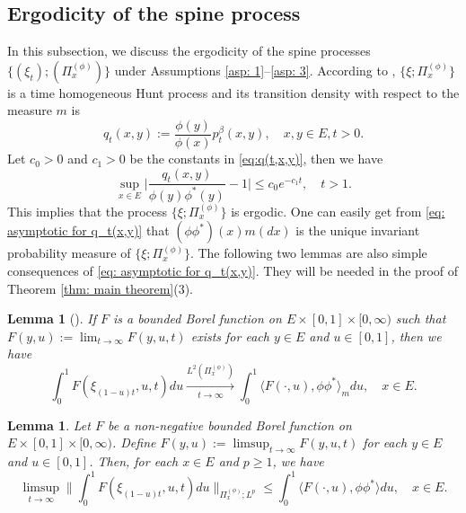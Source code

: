 \documentclass[12pt, a4paper]{amsart}
\newtheorem{lem}[thm]{Lemma}
\theoremstyle{definition}
\numberwithin{equation}{section}
\begin{document}
\subsection{Ergodicity of the spine process}
\label{sec: Ergodicity}
	In this subsection, we discuss the ergodicity of the spine processes 
	$\{(\xi_t); (\Pi^{(\phi)}_x)\}$ 
	under Assumptions \ref{asp: 1}--\ref{asp: 3}.
	According to \cite{KimSong2008Intrinsic}, $\{\xi; \Pi^{(\phi)}_x\}$ is a time homogeneous Hunt process and its transition density with respect to the measure $m$ is
\[
	q_t(x,y) := \frac{\phi(y)}{\phi(x)} p^\beta_t(x,y),
	\quad x,y\in E, t>0.
\]
Let   $c_0>0$ and $c_1>0$ be the constants  in \eqref{eq:q(t,x,y)}, then we have
\[\label{eq: asymptotic for q_t(x,y)}
	\sup_{x\in E} \Big| \frac{q_t(x,y)}{\phi(y)\phi^*(y)} - 1\Big|
	\leq c_0 e^{-c_1 t},
	\quad t > 1.
\]
	This implies that the process $\{\xi; \Pi^{(\phi)}_x\}$ is ergodic.
	One can easily get from \eqref{eq: asymptotic for q_t(x,y)} that $(\phi\phi^*)(x)m(dx)$ is the unique invariant probability measure of $\{\xi; \Pi^{(\phi)}_x\}$.
	The following two lemmas are also simple consequences of \eqref{eq: asymptotic for q_t(x,y)}.
	They will be needed in the proof of  Theorem \ref{thm: main theorem}(3).
\begin{lem}[{\cite[Lemma 5.6]{RenSongSun2017Spine}}] \label{lem: ergodicity of the underlying process}
	If $F$ is a bounded Borel function on $E\times [0,1]\times [0,\infty)$ such that $F(y,u):= \lim_{t\to \infty} F(y,u,t)$ exists for each $y\in E$ and $u \in [0,1]$, 
	then we have
\[
	\int_0^1 F(\xi_{(1-u)t},u,t) du
\xrightarrow[t\to \infty]{ L^2(\Pi_x^{(\phi)})} 
\int_0^1 \langle F(\cdot , u), \phi\phi^*\rangle_m du,
	\quad x\in E.
\]
\end{lem}
\begin{lem}\label{lem: Fatou-ergodic lemma for the uderlying process}
	Let $F$ be a non-negative bounded Borel function on $E\times [0,1]\times [0,\infty)$.
	Define $F(y,u):= \limsup_{t\to \infty} F(y,u,t)$ for each $y\in E$ and $u \in [0,1]$.
	Then, for each $x\in E$ and $p \geq 1$, we have
\[
	\limsup_{ t \to \infty}  \Big\| \int_0^1 F(\xi_{(1-u) t },u,t) du  \Big\|_{\Pi_x^{(\phi)};L^p}
	\leq \int_0^1 \langle F(\cdot, u), \phi \phi^*\rangle du,
	\quad x\in E.
\]
\end{lem}
\end{document}
